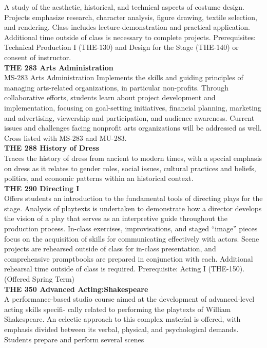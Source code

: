 \documentclass[
  letterpaper,
]{scrbook}
\begin{document}
A study of the aesthetic, historical, and technical aspects of costume
design. Projects emphasize research, character analysis, figure drawing,
textile selection, and rendering. Class includes lecture-demonstration
and practical application. Additional time outside of class is necessary
to complete projects. Prerequisites: Technical Production I (THE-130)
and Design for the Stage (THE-140) or consent of instructor.\\
\textbf{THE 283 Arts Administration}\\
MS-283 Arts Administration Implements the skills and guiding principles
of managing arts-related organizations, in particular non-profits.
Through collaborative efforts, students learn about project development
and implementation, focusing on goal-setting initiatives, financial
planning, marketing and advertising, viewership and participation, and
audience awareness. Current issues and challenges facing nonprofit arts
organizations will be addressed as well. Cross listed with MS-283 and
MU-283.\\
\textbf{THE 288 History of Dress}\\
Traces the history of dress from ancient to modern times, with a special
emphasis on dress as it relates to gender roles, social issues, cultural
practices and beliefs, politics, and economic patterns within an
historical context.\\
\textbf{THE 290 Directing I}\\
Offers students an introduction to the fundamental tools of directing
plays for the stage. Analysis of playtexts is undertaken to demonstrate
how a director develops the vision of a play that serves as an
interpretive guide throughout the production process. In-class
exercises, improvisations, and staged ``image'' pieces focus on the
acquisition of skills for communicating effectively with actors. Scene
projects are rehearsed outside of class for in-class presentation, and
comprehensive promptbooks are prepared in conjunction with each.
Additional rehearsal time outside of class is required. Prerequisite:
Acting I (THE-150). (Offered Spring Term)\\
\textbf{THE 350 Advanced Acting:Shakespeare}\\
A performance-based studio course aimed at the development of
advanced-level acting skills specifi- cally related to performing the
playtexts of William Shakespeare. An eclectic approach to this complex
material is offered, with emphasis divided between its verbal, physical,
and psychological demands. Students prepare and perform several scenes
\end{document}
